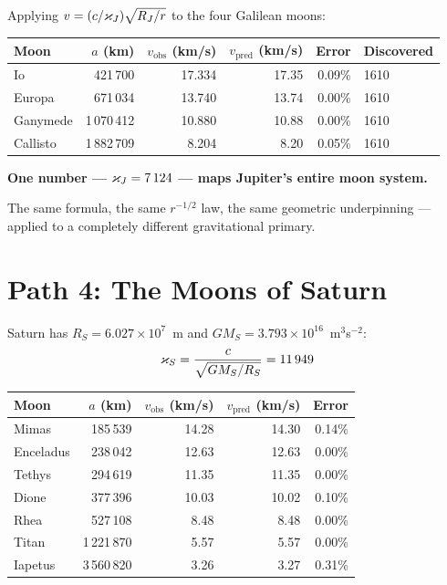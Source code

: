 Applying $v = (c/\varkappa_J)\sqrt{R_J/r}$ to the four Galilean moons:

\begin{center}
\begin{tabular}{lrrrrl}
\toprule
\textbf{Moon} & $a$ (km) & $v_{\text{obs}}$ (km/s) & $v_{\text{pred}}$ (km/s) & Error & Discovered \\
\midrule
Io       &   421\,700   & 17.334 & 17.35 & 0.09\% & 1610 \\
Europa   &   671\,034   & 13.740 & 13.74 & 0.00\% & 1610 \\
Ganymede & 1\,070\,412  & 10.880 & 10.88 & 0.00\% & 1610 \\
Callisto & 1\,882\,709  &  8.204 &  8.20 & 0.05\% & 1610 \\
\bottomrule
\end{tabular}
\end{center}

\textbf{One number --- $\varkappa_J = 7\,124$ --- maps Jupiter's entire moon system.}

The same formula, the same $r^{-1/2}$ law, the same geometric underpinning --- applied to a completely different gravitational primary.


\section{Path 4: The Moons of Saturn}
\label{sec:path4}

Saturn has $R_S = 6.027 \times 10^7$~m and $GM_S = 3.793 \times 10^{16}$~m$^3$s$^{-2}$:
\begin{equation}
  \varkappa_S = \frac{c}{\sqrt{GM_S/R_S}} = 11\,949
\end{equation}

\begin{center}
\begin{tabular}{lrrrr}
\toprule
\textbf{Moon} & $a$ (km) & $v_{\text{obs}}$ (km/s) & $v_{\text{pred}}$ (km/s) & Error \\
\midrule
Mimas      &   185\,539   & 14.28 & 14.30 & 0.14\% \\
Enceladus  &   238\,042   & 12.63 & 12.63 & 0.00\% \\
Tethys     &   294\,619   & 11.35 & 11.35 & 0.00\% \\
Dione      &   377\,396   & 10.03 & 10.02 & 0.10\% \\
Rhea       &   527\,108   &  8.48 &  8.48 & 0.00\% \\
Titan      & 1\,221\,870  &  5.57 &  5.57 & 0.00\% \\
Iapetus    & 3\,560\,820  &  3.26 &  3.27 & 0.31\% \\
\bottomrule
\end{tabular}
\end{center}

